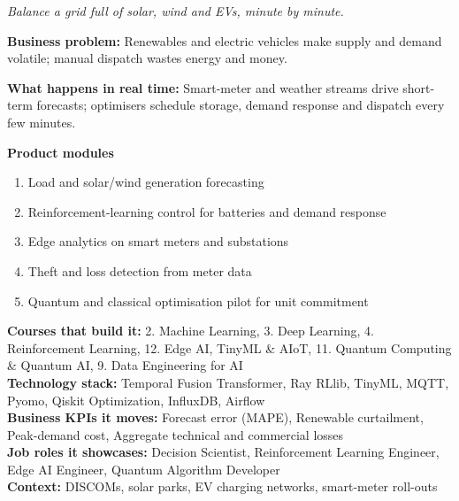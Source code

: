 \documentclass[10pt,a4paper]{article}
\begin{document}
\begin{tcolorbox}[enhanced,breakable,colback=white,colframe=navy,boxrule=0.6pt,arc=2pt,title={\color{goldl}PRODUCT 7 \;|\; ENERGY, UTILITIES \& CLIMATE\\\color{white}\large Smart Grid Forecasting \& Optimisation Platform},colbacktitle=navy,fonttitle=\small\bfseries]
{\small\itshape\color{muted}Balance a grid full of solar, wind and EVs, minute by minute.}\par
\begin{tcolorbox}[colback=l1bg,colframe=l1bg,arc=2pt,borderline west={3pt}{0pt}{saffron},top=2pt,bottom=2pt]\small\textbf{Business problem:} Renewables and electric vehicles make supply and demand volatile; manual dispatch wastes energy and money.\end{tcolorbox}
\begin{tcolorbox}[colback=l3bg,colframe=l3bg,arc=2pt,borderline west={3pt}{0pt}{igreen},top=2pt,bottom=2pt]\small\textbf{What happens in real time:} Smart-meter and weather streams drive short-term forecasts; optimisers schedule storage, demand response and dispatch every few minutes.\end{tcolorbox}
{\small\textbf{Product modules}}\begin{enumerate}\small
\item Load and solar/wind generation forecasting
\item Reinforcement-learning control for batteries and demand response
\item Edge analytics on smart meters and substations
\item Theft and loss detection from meter data
\item Quantum and classical optimisation pilot for unit commitment
\end{enumerate}
{\small\textbf{Courses that build it:} 2. Machine Learning, 3. Deep Learning, 4. Reinforcement Learning, 12. Edge AI, TinyML \& AIoT, 11. Quantum Computing \& Quantum AI, 9. Data Engineering for AI\\\textbf{Technology stack:} Temporal Fusion Transformer, Ray RLlib, TinyML, MQTT, Pyomo, Qiskit Optimization, InfluxDB, Airflow\\\textbf{Business KPIs it moves:} Forecast error (MAPE), Renewable curtailment, Peak-demand cost, Aggregate technical and commercial losses\\\textbf{Job roles it showcases:} Decision Scientist, Reinforcement Learning Engineer, Edge AI Engineer, Quantum Algorithm Developer\\\textbf{Context:} DISCOMs, solar parks, EV charging networks, smart-meter roll-outs}
\end{tcolorbox}
\end{document}
